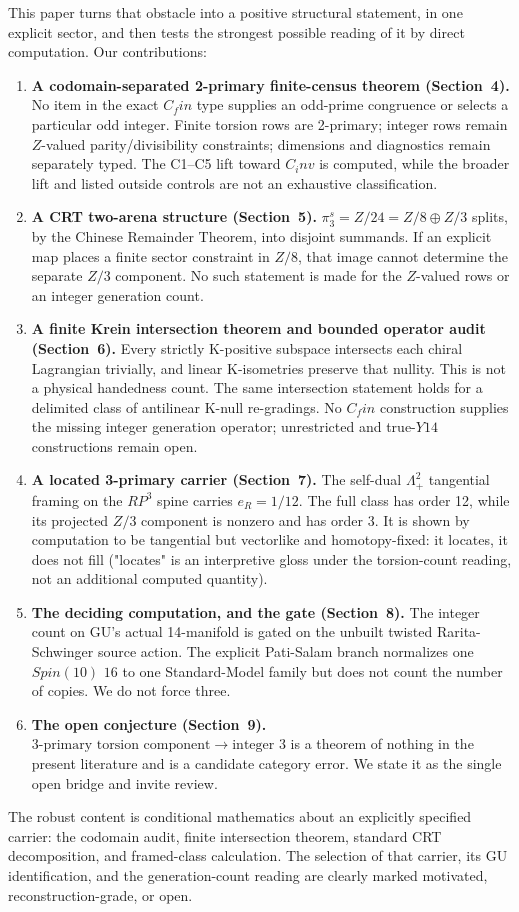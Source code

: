 \documentclass[11pt]{article}
\theoremstyle{remark}
\begin{document}
This paper turns that obstacle into a positive structural statement, in one explicit sector, and then tests the strongest possible reading of it by direct computation. Our contributions:

\begin{enumerate}[leftmargin=2em]
\item \textbf{A codomain-separated 2-primary finite-census theorem (Section~4).} No item in the exact $C_fin$ type supplies an odd-prime congruence or selects a particular odd integer. Finite torsion rows are 2-primary; integer rows remain $Z$-valued parity/divisibility constraints; dimensions and diagnostics remain separately typed. The C1--C5 lift toward $C_inv$ is computed, while the broader lift and listed outside controls are not an exhaustive classification.
\item \textbf{A CRT two-arena structure (Section~5).} $\pi_3^s = Z/24 = Z/8 \oplus Z/3$ splits, by the Chinese Remainder Theorem, into disjoint summands. If an explicit map places a finite sector constraint in $Z/8$, that image cannot determine the separate $Z/3$ component. No such statement is made for the $Z$-valued rows or an integer generation count.
\item \textbf{A finite Krein intersection theorem and bounded operator audit (Section~6).} Every strictly K-positive subspace intersects each chiral Lagrangian trivially, and linear K-isometries preserve that nullity. This is not a physical handedness count. The same intersection statement holds for a delimited class of antilinear K-null re-gradings. No $C_fin$ construction supplies the missing integer generation operator; unrestricted and true-$Y14$ constructions remain open.
\item \textbf{A located 3-primary carrier (Section~7).} The self-dual $\Lambda^2_+$ tangential framing on the $RP^3$ spine carries $e_R = 1/12$. The full class has order 12, while its projected $Z/3$ component is nonzero and has order 3. It is shown by computation to be tangential but vectorlike and homotopy-fixed: it locates, it does not fill ("locates" is an interpretive gloss under the torsion-count reading, not an additional computed quantity).
\item \textbf{The deciding computation, and the gate (Section~8).} The integer count on GU's actual 14-manifold is gated on the unbuilt twisted Rarita-Schwinger source action. The explicit Pati-Salam branch normalizes one $Spin(10)$ $16$ to one Standard-Model family but does not count the number of copies. We do not force three.
\item \textbf{The open conjecture (Section~9).} $3\text{-primary torsion component}\to\text{integer }3$ is a theorem of nothing in the present literature and is a candidate category error. We state it as the single open bridge and invite review.
\end{enumerate}
The robust content is conditional mathematics about an explicitly specified carrier: the codomain audit, finite intersection theorem, standard CRT decomposition, and framed-class calculation. The selection of that carrier, its GU identification, and the generation-count reading are clearly marked motivated, reconstruction-grade, or open.
\end{document}
